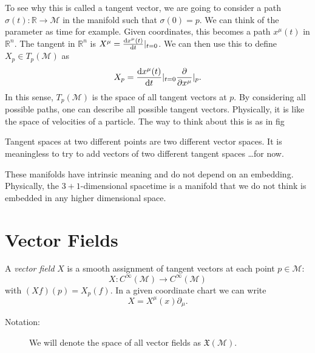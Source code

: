 To see why this is called a tangent vector, we are going to consider a path $\sigma(t): \mathbb{R} \to \mathcal{M}$ in the manifold such that $\sigma(0) = p$. We can think of the parameter as time for example.
Given coordinates, this becomes a path $x^\mu(t)$ in $\mathbb{R}^n$. The tangent in $\mathbb{R}^n$ is $X^\mu = \dv{x^\mu(t)}{t}\rvert_{t=0}$. We can then use this to define $X_p \in T_p(\mathcal{M})$ as
\begin{equation}
  X_p = \dv{x^\mu(t)}{t} \rvert_{t = 0 } \pdv{}{x^\mu} \rvert_p.
\end{equation}
In this sense, $T_p(\mathcal{M})$ is the space of all tangent vectors at $p$.
By considering all possible paths, one can describe all possible tangent vectors. Physically, it is like the space of velocities of a particle.
The way to think about this is as in fig
\begin{leftbar}
  \begin{remark}
    Tangent spaces at two different points are two different vector spaces. It is meaningless to try to add vectors of two different tangent spaces \ldots for now.
  \end{remark}
\end{leftbar}
\begin{leftbar}
  \begin{remark}
    These manifolds have intrinsic meaning and do not depend on an embedding. Physically, the $3+1$-dimensional spacetime is a manifold that we do not think is embedded in any higher dimensional space.
  \end{remark}
\end{leftbar}

\section{Vector Fields}%
\label{sec:vector_fields}

\begin{definition}
  A \emph{vector field} $X$ is a smooth assignment of tangent vectors at each point $p \in \mathcal{M}$:
  \begin{equation}
    X: C^\infty(\mathcal{M}) \to C^\infty(\mathcal{M})
  \end{equation}
  with $(Xf)(p) = X_p (f)$. In a given coordinate chart we can write
  \begin{equation}
    X = X^\mu (x) \partial_\mu.
  \end{equation} 
\end{definition}
\begin{description}
  \item[Notation:] We will denote the space of all vector fields as $\mathfrak{X} (\mathcal{M})$.
\end{description}

